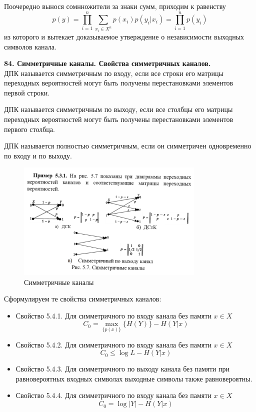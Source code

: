\documentclass[14pt]{article}
\begin{document}
Поочередно вынося сомнножители за знаки сумм, приходим к 
равенству
\begin{displaymath}
    p(y) =  \prod_{i=1}^{n} \sum_{x_i \in X^n} p(x_i)p(y_i|x_i) = \prod_{i=1}^{n} p(y_i)
\end{displaymath}
из которого и вытекает доказываемое утверждение о независимости
выходных символов канала.

\bigskip
\textbf{84. Симметричные каналы. Свойства симметричных каналов.} \\

ДПК называется симметричным по входу, если все строки его
матрицы переходных вероятностей могут быть получены
перестановками элементов первой строки.

ДПК называется симметричным по выходу, если все столбцы его
матрицы переходных вероятностей могут быть получены
перестановками элементов первого столбца.

ДПК называется полностью симметричным, если он симметричен
одновременно по входу и по выходу.

\begin{figure}[ht!]
\centering
    \includegraphics[width=90mm]{gates.png}
\caption{Симметричные каналы}
\end{figure}

Сформулируем те свойства симметричных каналов:
\begin{itemize}
    \item Свойство 5.4.1. Для симметричного по входу канала без памяти \(x \in X\) \[C_0 = \max_{\{p(x)\}} \{H(Y)\} - H(Y|x)\]
    \item Свойство 5.4.2. Для симметричного по входу канала без памяти \(x \in X\) \[C_0 \leq \log L -  H(Y|x)\]
    \item Свойство 5.4.3. Для симметричного по выходу канала без памяти при равновероятных входных символах выходные символы также равновероятны.
    \item Свойство 5.4.4. Для симметричного по входу канала без памяти \(x \in X\) \[C_0 = \log|Y| -  H(Y|x)\]
\end{itemize}
\end{document}
